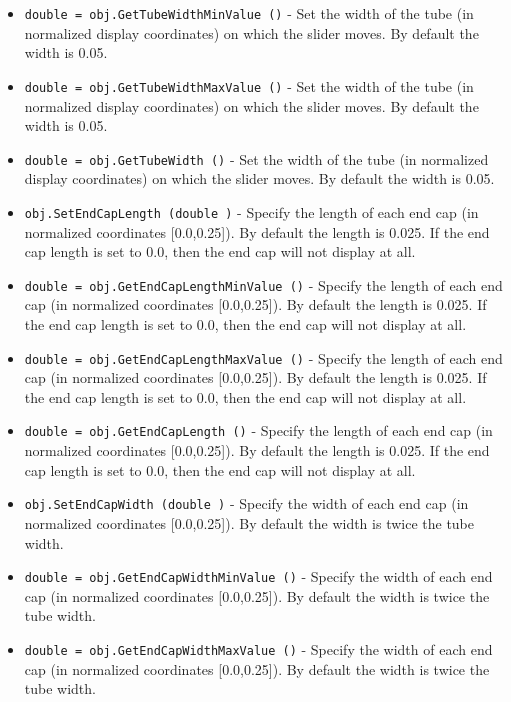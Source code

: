 \begin{itemize}
\item  \verb|double = obj.GetTubeWidthMinValue ()| -  Set the width of the tube (in normalized display coordinates) on which
 the slider moves. By default the width is 0.05.

\item  \verb|double = obj.GetTubeWidthMaxValue ()| -  Set the width of the tube (in normalized display coordinates) on which
 the slider moves. By default the width is 0.05.

\item  \verb|double = obj.GetTubeWidth ()| -  Set the width of the tube (in normalized display coordinates) on which
 the slider moves. By default the width is 0.05.

\item  \verb|obj.SetEndCapLength (double )| -  Specify the length of each end cap (in normalized coordinates
 [0.0,0.25]). By default the length is 0.025. If the end cap length
 is set to 0.0, then the end cap will not display at all.

\item  \verb|double = obj.GetEndCapLengthMinValue ()| -  Specify the length of each end cap (in normalized coordinates
 [0.0,0.25]). By default the length is 0.025. If the end cap length
 is set to 0.0, then the end cap will not display at all.

\item  \verb|double = obj.GetEndCapLengthMaxValue ()| -  Specify the length of each end cap (in normalized coordinates
 [0.0,0.25]). By default the length is 0.025. If the end cap length
 is set to 0.0, then the end cap will not display at all.

\item  \verb|double = obj.GetEndCapLength ()| -  Specify the length of each end cap (in normalized coordinates
 [0.0,0.25]). By default the length is 0.025. If the end cap length
 is set to 0.0, then the end cap will not display at all.

\item  \verb|obj.SetEndCapWidth (double )| -  Specify the width of each end cap (in normalized coordinates
 [0.0,0.25]). By default the width is twice the tube width. 

\item  \verb|double = obj.GetEndCapWidthMinValue ()| -  Specify the width of each end cap (in normalized coordinates
 [0.0,0.25]). By default the width is twice the tube width. 

\item  \verb|double = obj.GetEndCapWidthMaxValue ()| -  Specify the width of each end cap (in normalized coordinates
 [0.0,0.25]). By default the width is twice the tube width. 


\end{itemize}
